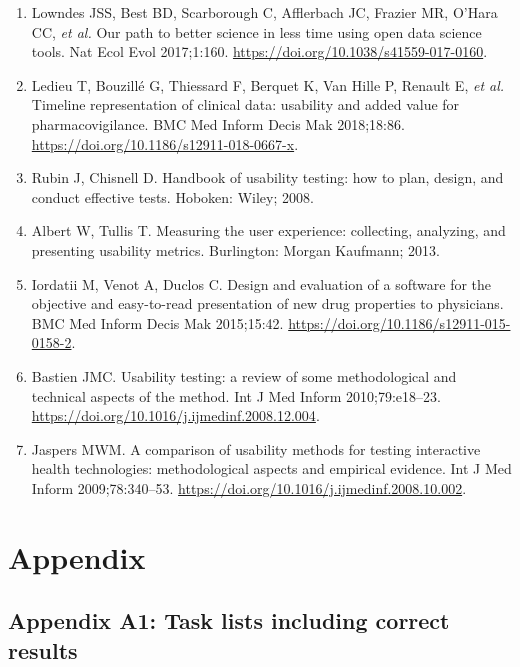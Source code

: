 \documentclass[
]{book}
\begin{document}
\begin{enumerate}
\item
  Lowndes JSS, Best BD, Scarborough C, Afflerbach JC, Frazier MR, O'Hara CC, \emph{et al.} Our path to better science in less time using open data science tools. Nat Ecol Evol 2017;1:160. \url{https://doi.org/10.1038/s41559-017-0160}.
\item
  Ledieu T, Bouzillé G, Thiessard F, Berquet K, Van Hille P, Renault E, \emph{et al.} Timeline representation of clinical data: usability and added value for pharmacovigilance. BMC Med Inform Decis Mak 2018;18:86. \url{https://doi.org/10.1186/s12911-018-0667-x}.
\item
  Rubin J, Chisnell D. Handbook of usability testing: how to plan, design, and conduct effective tests. Hoboken: Wiley; 2008.
\item
  Albert W, Tullis T. Measuring the user experience: collecting, analyzing, and presenting usability metrics. Burlington: Morgan Kaufmann; 2013.
\item
  Iordatii M, Venot A, Duclos C. Design and evaluation of a software for the objective and easy-to-read presentation of new drug properties to physicians. BMC Med Inform Decis Mak 2015;15:42. \url{https://doi.org/10.1186/s12911-015-0158-2}.
\item
  Bastien JMC. Usability testing: a review of some methodological and technical aspects of the method. Int J Med Inform 2010;79:e18--23. \url{https://doi.org/10.1016/j.ijmedinf.2008.12.004}.
\item
  Jaspers MWM. A comparison of usability methods for testing interactive health technologies: methodological aspects and empirical evidence. Int J Med Inform 2009;78:340--53. \url{https://doi.org/10.1016/j.ijmedinf.2008.10.002}.
\end{enumerate}

\hypertarget{appendix}{%
\section*{Appendix}\label{appendix}}

\hypertarget{appendix-a1-task-lists-including-correct-results}{%
\subsection*{Appendix A1: Task lists including correct results}\label{appendix-a1-task-lists-including-correct-results}}
\end{document}
